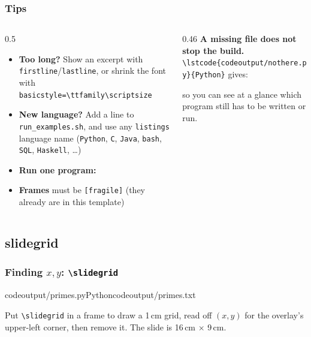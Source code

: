 \documentclass[aspectratio=169,10pt,compress]{beamer}
\begin{document}
\begin{frame}[t,fragile] \frametitle{Tips}
  \begin{columns}[T]
    \begin{column}{0.5\textwidth}
      \begin{itemize}\small
        \item \textbf{Too long?} Show an excerpt with \texttt{firstline}/\texttt{lastline},
              or shrink the font with \texttt{basicstyle=\textbackslash ttfamily\textbackslash scriptsize}
        \item \textbf{New language?} Add a line to \texttt{run\_examples.sh}, and use any
              \texttt{listings} language name (\texttt{Python}, \texttt{C}, \texttt{Java},
              \texttt{bash}, \texttt{SQL}, \texttt{Haskell}, \dots)
        \item \textbf{Run one program:} 
        \item \textbf{Frames} must be \texttt{[fragile]} (they already are in this template)
      \end{itemize}
    \end{column}
    \begin{column}{0.46\textwidth}
      \small \textbf{A missing file does not stop the build.}
      \verb|\lstcode{codeoutput/nothere.py}{Python}| gives:
      \vspace{0.3em}


      \small so you can see at a glance which program still has to be written or run.
    \end{column}
  \end{columns}
\end{frame}




\subsection[slidegrid]{slidegrid}




\begin{frame}[t,fragile] \frametitle{Finding $x,y$: \texttt{\textbackslash slidegrid}}
  \slidegrid
  \lstcodeoverlaystep[basicstyle=\ttfamily\scriptsize][][0.4\textwidth]{8.9cm,2.1cm}%
    {codeoutput/primes.py}{Python}{codeoutput/primes.txt}

  \small Put \verb|\slidegrid| in a frame to draw a 1\,cm grid, read off $(x,y)$ for the
  overlay's upper-left corner, then remove it. The slide is 16\,cm $\times$ 9\,cm.
\end{frame}




\begin{frame}[t,fragile]
	\begin{center}
		\vspace{4cm}
		\\
	\end{center}
\end{frame}
\end{document}
